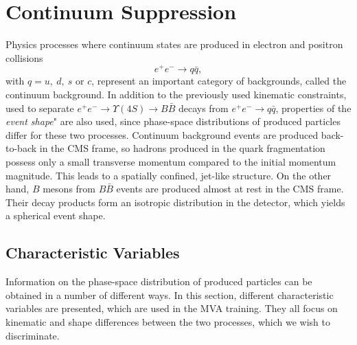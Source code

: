 \section{Continuum Suppression}

Physics processes where continuum states are produced in electron and positron collisions $$e^+ e^- \to q \bar q,$$ 
with $q = u,~d,~s$ or $c$, represent an important category of backgrounds, called the continuum background. In addition to the previously used kinematic constraints, used to separate $e^+ e^- \to \Upsilon(4S) \to B \bar B$ decays from $e^+ e^- \to q \bar q$, properties of the \textit{event shape}" are also used, since phase-space distributions of produced particles differ for these two processes. Continuum background events are produced back-to-back in the CMS frame, so hadrons produced in the quark fragmentation possess only a small transverse momentum compared to the initial momentum magnitude. This leads to a spatially confined, jet-like structure. On the other hand, $B$ mesons from $B \bar B$ events are produced almost at rest in the CMS frame. Their decay products form an isotropic distribution in the detector, which yields a spherical event shape.

\subsection{Characteristic Variables}
\label{ss:charvar}
Information on the phase-space distribution of produced particles can be obtained in a number of different ways. In this section, different characteristic variables are presented, which are used in the MVA training. They all focus on kinematic and shape differences between the two processes, which we wish to discriminate. 


